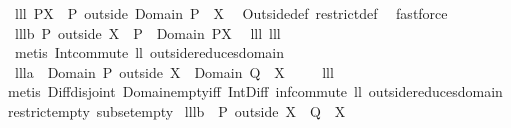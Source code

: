 \begin{isabellebody}
\endisatagproof
{\isafoldproof}%
%
\isadelimproof
%
\endisadelimproof
\isanewline
\isanewline
{}\isamarkupfalse%
\ lll{}{}{\isacharcolon}\ {\isachardoublequoteopen}P{\isacharbar}{\isacharbar}X\ {\isacharequal}\ P\ outside\ {\isacharparenleft}Domain\ P\ {\isacharminus}\ X{\isacharparenright}{\isachardoublequoteclose}\ \isanewline
%
\isadelimproof
%
\endisadelimproof
%
\isatagproof
{}\isamarkupfalse%
\ Outside{\isacharunderscore}def\ restrict{\isacharunderscore}def\ \isamarkupfalse%
\ fastforce%
\endisatagproof
{\isafoldproof}%
%
\isadelimproof
\isanewline
%
\endisadelimproof
{}\isamarkupfalse%
\ lll{}{}b{\isacharcolon}\ {\isachardoublequoteopen}P\ outside\ X\ {\isasymsubseteq}\ P\ {\isacharbar}{\isacharbar}\ {\isacharparenleft}{\isacharparenleft}Domain\ P{\isacharparenright}{\isacharminus}X{\isacharparenright}{\isachardoublequoteclose}\ \isanewline
%
\isadelimproof
%
\endisadelimproof
%
\isatagproof
{}\isamarkupfalse%
\ lll{}{}\ lll{}{}\ \isamarkupfalse%
\ {\isacharparenleft}metis\ Int{\isacharunderscore}commute\ ll{}{}\ outside{\isacharunderscore}reduces{\isacharunderscore}domain{\isacharparenright}%
\endisatagproof
{\isafoldproof}%
%
\isadelimproof
\isanewline
%
\endisadelimproof
\isanewline
{}\isamarkupfalse%
\ lll{}{}a{\isacharcolon}\ \ {\isachardoublequoteopen}Domain\ {\isacharparenleft}P\ outside\ X{\isacharparenright}\ {\isasyminter}\ Domain\ {\isacharparenleft}Q\ {\isacharbar}{\isacharbar}\ X{\isacharparenright}\ {\isasymsubseteq}\ {\isacharbraceleft}{\isacharbraceright}{\isachardoublequoteclose}%
\isadelimproof
\ %
\endisadelimproof
%
\isatagproof
{}\isamarkupfalse%
\ lll{}{}\ \isamarkupfalse%
\ \isanewline
{\isacharparenleft}metis\ Diff{\isacharunderscore}disjoint\ Domain{\isacharunderscore}empty{\isacharunderscore}iff\ Int{\isacharunderscore}Diff\ inf{\isacharunderscore}commute\ ll{}{}\ outside{\isacharunderscore}reduces{\isacharunderscore}domain\ restrict{\isacharunderscore}empty\ subset{\isacharunderscore}empty{\isacharparenright}%
\endisatagproof
{\isafoldproof}%
%
\isadelimproof
%
\endisadelimproof
\isanewline
\isanewline
{}\isamarkupfalse%
\ lll{}{}b{\isacharcolon}\ \ {\isachardoublequoteopen}{\isacharparenleft}P\ outside\ X{\isacharparenright}\ {\isasyminter}\ {\isacharparenleft}Q\ {\isacharbar}{\isacharbar}\ X{\isacharparenright}\ {\isacharequal}\ {\isacharbraceleft}{\isacharbraceright}{\isachardoublequoteclose}%

\end{isabellebody}
